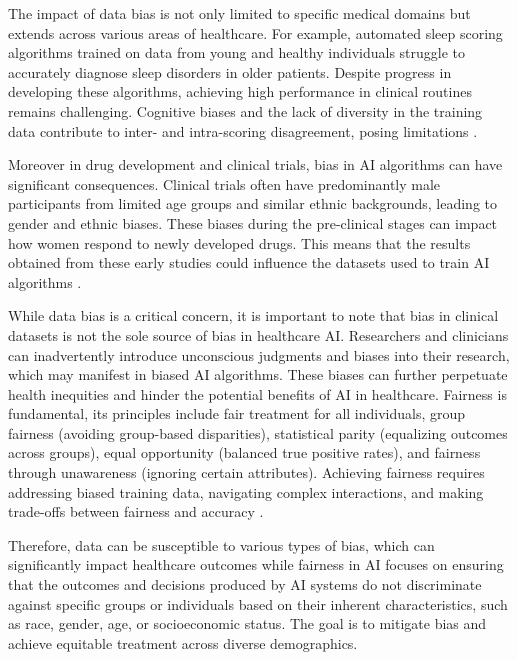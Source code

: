 \documentclass{article}
\begin{document}
The impact of data bias is not only limited to specific medical domains but extends across various areas of healthcare. For example, automated sleep scoring algorithms trained on data from young and healthy individuals struggle to accurately diagnose sleep disorders in older patients. Despite progress in developing these algorithms, achieving high performance in clinical routines remains challenging. Cognitive biases and the lack of diversity in the training data contribute to inter- and intra-scoring disagreement, posing limitations \cite{FIORILLO2019101204}.

Moreover in drug development and clinical trials, bias in AI algorithms can have significant consequences. Clinical trials often have predominantly male participants from limited age groups and similar ethnic backgrounds, leading to gender and ethnic biases. These biases during the pre-clinical stages can impact how women respond to newly developed drugs. This means that the results obtained from these early studies could influence the datasets used to train AI algorithms \cite{oh2015diversity, chandak2020using}.

While data bias is a critical concern, it is important to note that bias in clinical datasets is not the sole source of bias in healthcare AI. Researchers and clinicians can inadvertently introduce unconscious judgments and biases into their research, which may manifest in biased AI algorithms. These biases can further perpetuate health inequities and hinder the potential benefits of AI in healthcare. Fairness is fundamental, its principles include fair treatment for all individuals, group fairness (avoiding group-based disparities), statistical parity (equalizing outcomes across groups), equal opportunity (balanced true positive rates), and fairness through unawareness (ignoring certain attributes). Achieving fairness requires addressing biased training data, navigating complex interactions, and making trade-offs between fairness and accuracy \cite{ueda2023fairness}.

Therefore, data can be susceptible to various types of bias, which can significantly impact healthcare outcomes while fairness in AI focuses on ensuring that the outcomes and decisions produced by AI systems do not discriminate against specific groups or individuals based on their inherent characteristics, such as race, gender, age, or socioeconomic status. The goal is to mitigate bias and achieve equitable treatment across diverse demographics.
\end{document}

